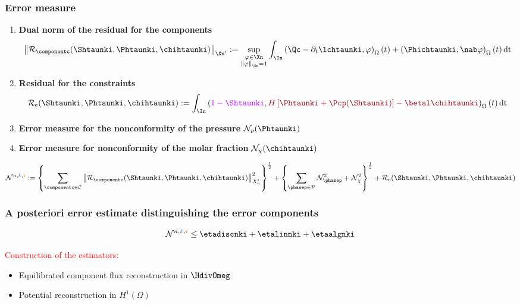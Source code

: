 \begin{frame}
\frametitle{Error measure}
\vspace{-0.3 cm}
\begin{enumerate}
\item<1> 
\textcolor{cadmiumgreen}{\textbf{Dual norm of the residual for the components}}
 \begin{equation*}
\left\|\mathcal{R}_{\componentc}(\Shtaunki,\Phtaunki,\chihtaunki) \right\|_{\Xn'} \egaldef \sup_{\substack{\varphi \in \Xn \\ \left\|\varphi\right\|_{\Xn} = 1}}  \int_{\In} 
 \left(\Qc - \partial_t \lchtaunki , \varphi\right)_{\Omega}(t) + \left(\Phichtaunki,\nab \varphi \right)_{\Omega}(t)\,\mathrm{dt} 
 \end{equation*}
\pause
\item<2>
\textcolor{cadmiumgreen}{\textbf{Residual for the constraints}}
\begin{equation*}
  \mathcal{R}_{\mathrm{e}}(\Shtaunki,\Phtaunki,\chihtaunki) \egaldef \int_{\In}\left(\textcolor{electricpurple}{1 - \Shtaunki}, \textcolor{carmine}{H \left[\Phtaunki + \Pcp(\Shtaunki)\right] - \betal \chihtaunki} \right)_{\Omega}(t)\,\mathrm{dt}
\end{equation*}
\pause
\item<3>
\textcolor{cadmiumgreen}{\textbf{Error measure for the nonconformity of the pressure}} $\mathcal{N}_{p}(\Phtaunki)$
\pause
\item<4>
\textcolor{cadmiumgreen}{\textbf{Error measure for nonconformity of the molar fraction}} $\mathcal{N}_{\chi}(\chihtaunki)$
\end{enumerate}
\vspace{0.3 cm}
\begin{equation*}
\mathcal{N}^{n,\kk,\ii}  \egaldef \left\{\sum_{\componentc \in\mathcal{C}} \left\|\mathcal{R}_{\componentc}(\Shtaunki,\Phtaunki,\chihtaunki) \right\|_{X_n'}^2 \right\}^{\frac{1}{2}} + \left\{\sum_{\phasep \in \mathcal{P}}\mathcal{N}_{\phasep}^2 + \mathcal{N}_{\chi}^2\right\}^{\frac{1}{2}} + \mathcal{R}_{\mathrm{e}}(\Shtaunki,\Phtaunki,\chihtaunki)
\end{equation*}
\end{frame}
\begin{frame}
\frametitle{A posteriori error estimate distinguishing the error components}


\begin{theorem}
\begin{equation*}
\mathcal{N}^{n,\kk,\ii} \leq \etadiscnki + \etalinnki + \etaalgnki
\end{equation*}
\end{theorem}
\textcolor{red}{Construction of the estimators:} 
\begin{itemize}
\item Equilibrated component flux reconstruction in $\HdivOmeg$
\item Potential reconstruction in $H^1(\Omega)$ 
\end{itemize}
\end{frame}
